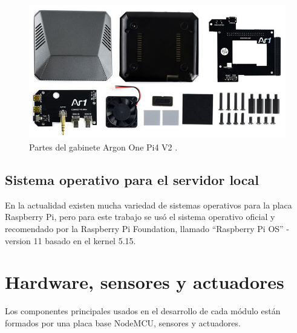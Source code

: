 \begin{figure}[htpb]
\centering 
\includegraphics[width=1.0\textwidth]{./Figures/argon2.jpg}
\caption{Partes del gabinete Argon One Pi4 V2 \protect\footnotemark.}
\label{fig:armado}
\end{figure}

\subsection{Sistema operativo para el servidor local}

En la actualidad existen mucha variedad de sistemas operativos para la placa Raspberry Pi, pero para este trabajo se usó el sistema operativo oficial y recomendado por la Raspberry Pi Foundation, llamado ``Raspberry Pi OS'' - version 11 basado en el kernel 5.15.



\section{Hardware, sensores y actuadores}

Los componentes principales usados en el desarrollo de cada módulo están formados por una placa base NodeMCU, sensores y actuadores.

